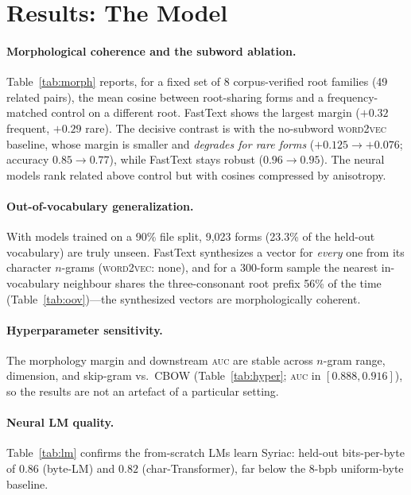 \documentclass[11pt]{article}
\newcommand{\auc}{\textsc{auc}}
\newcommand{\auc}{\textsc{auc}}
\begin{document}
\section{Results: The Model}
\label{sec:results-model}

\paragraph{Morphological coherence and the subword ablation.}
Table~\ref{tab:morph} reports, for a fixed set of 8 corpus-verified root families
(49 related pairs), the mean cosine between root-sharing forms and a
frequency-matched control on a different root. FastText shows the largest margin
($+0.32$ frequent, $+0.29$ rare). The decisive contrast is with the no-subword
\textsc{word2vec} baseline, whose margin is smaller and \emph{degrades for rare
forms} ($+0.125\to+0.076$; accuracy $0.85\to0.77$), while FastText stays robust
($0.96\to0.95$). The neural models rank related above control but with cosines
compressed by anisotropy.



\paragraph{Out-of-vocabulary generalization.}
With models trained on a 90\% file split, 9{,}023 forms (23.3\% of the held-out
vocabulary) are truly unseen. FastText synthesizes a vector for \emph{every} one
from its character $n$-grams (\textsc{word2vec}: none), and for a 300-form sample
the nearest in-vocabulary neighbour shares the three-consonant root prefix 56\% of
the time (Table~\ref{tab:oov})---the synthesized vectors are morphologically
coherent.



\paragraph{Hyperparameter sensitivity.}
The morphology margin and downstream \auc{} are stable across $n$-gram range,
dimension, and skip-gram vs.\ CBOW (Table~\ref{tab:hyper}; \auc{} in
$[0.888,0.916]$), so the results are not an artefact of a particular setting.



\paragraph{Neural LM quality.}
Table~\ref{tab:lm} confirms the from-scratch LMs learn Syriac: held-out
bits-per-byte of $0.86$ (byte-LM) and $0.82$ (char-Transformer), far below the
8-bpb uniform-byte baseline.
\end{document}
